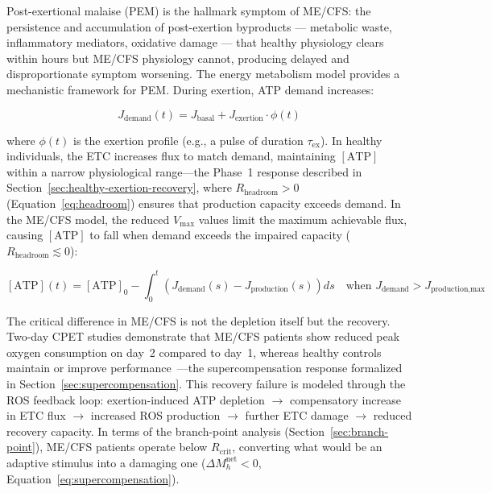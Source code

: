 Post-exertional malaise (PEM) is the hallmark symptom of ME/CFS: the persistence and accumulation of post-exertion byproducts --- metabolic waste, inflammatory mediators, oxidative damage --- that healthy physiology clears within hours but ME/CFS physiology cannot, producing delayed and disproportionate symptom worsening. The energy metabolism model provides a mechanistic framework for PEM. During exertion, ATP demand increases:

\begin{equation}
\label{eq:demand-exertion}
J_{\text{demand}}(t) = J_{\text{basal}} + J_{\text{exertion}} \cdot \phi(t)
\end{equation}

where $\phi(t)$ is the exertion profile (e.g., a pulse of duration $\tau_{\text{ex}}$). In healthy individuals, the ETC increases flux to match demand, maintaining $[\text{ATP}]$ within a narrow physiological range---the Phase~1 response described in Section~\ref{sec:healthy-exertion-recovery}, where $R_{\text{headroom}} > 0$ (Equation~\ref{eq:headroom}) ensures that production capacity exceeds demand. In the ME/CFS model, the reduced $V_{\max}$ values limit the maximum achievable flux, causing $[\text{ATP}]$ to fall when demand exceeds the impaired capacity ($R_{\text{headroom}} \lesssim 0$):

\begin{equation}
\label{eq:atp-depletion}
[\text{ATP}](t) = [\text{ATP}]_0 - \int_0^t \left( J_{\text{demand}}(s) - J_{\text{production}}(s) \right) ds \quad \text{when } J_{\text{demand}} > J_{\text{production,max}}
\end{equation}

The critical difference in ME/CFS is not the depletion itself but the recovery. Two-day CPET studies demonstrate that ME/CFS patients show reduced peak oxygen consumption on day~2 compared to day~1, whereas healthy controls maintain or improve performance~\cite{keller2024cpet}---the supercompensation response formalized in Section~\ref{sec:supercompensation}. This recovery failure is modeled through the ROS feedback loop: exertion-induced ATP depletion $\to$ compensatory increase in ETC flux $\to$ increased ROS production $\to$ further ETC damage $\to$ reduced recovery capacity. In terms of the branch-point analysis (Section~\ref{sec:branch-point}), ME/CFS patients operate below $R_{\text{crit}}$, converting what would be an adaptive stimulus into a damaging one ($\Delta M_h^{\text{net}} < 0$, Equation~\ref{eq:supercompensation}).

